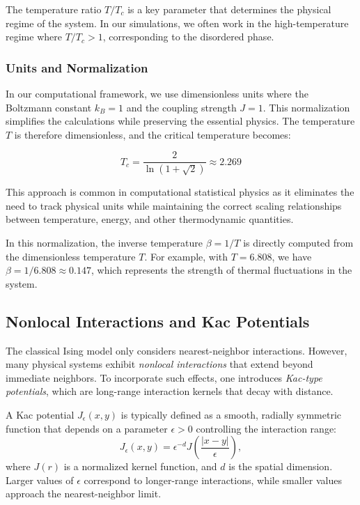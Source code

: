 \documentclass[11pt,a4paper]{article}
\begin{document}
The temperature ratio $T/T_c$ is a key parameter that determines the physical regime of the system. In our simulations, we often work in the high-temperature regime where $T/T_c > 1$, corresponding to the disordered phase.

\subsubsection{Units and Normalization}

In our computational framework, we use dimensionless units where the Boltzmann constant $k_B = 1$ and the coupling strength $J = 1$. This normalization simplifies the calculations while preserving the essential physics. The temperature $T$ is therefore dimensionless, and the critical temperature becomes:

\begin{equation}
T_c = \frac{2}{\ln(1 + \sqrt{2})} \approx 2.269
\end{equation}

This approach is common in computational statistical physics as it eliminates the need to track physical units while maintaining the correct scaling relationships between temperature, energy, and other thermodynamic quantities.

In this normalization, the inverse temperature $\beta = 1/T$ is directly computed from the dimensionless temperature $T$. For example, with $T = 6.808$, we have $\beta = 1/6.808 \approx 0.147$, which represents the strength of thermal fluctuations in the system.

\subsection{Nonlocal Interactions and Kac Potentials}

The classical Ising model only considers nearest-neighbor interactions. 
However, many physical systems exhibit \emph{nonlocal interactions} that extend beyond immediate neighbors. 
To incorporate such effects, one introduces \emph{Kac-type potentials}, which are long-range interaction kernels that decay with distance.

A Kac potential $J_\epsilon(x,y)$ is typically defined as a smooth, radially symmetric function that depends on a parameter $\epsilon > 0$ controlling the interaction range:
\begin{equation}
    J_\epsilon(x, y) = \epsilon^{-d} J\left(\frac{|x - y|}{\epsilon}\right),
\end{equation}
where $J(r)$ is a normalized kernel function, and $d$ is the spatial dimension. Larger values of $\epsilon$ correspond to longer-range interactions, while smaller values approach the nearest-neighbor limit.
\end{document}
